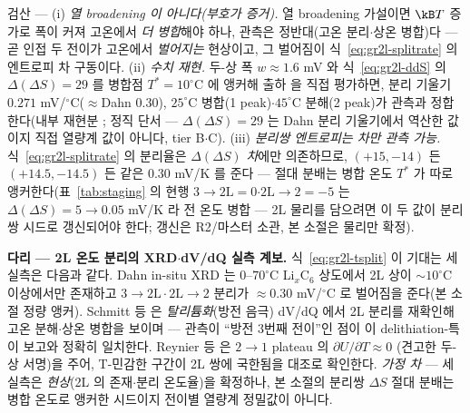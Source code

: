 \begin{verifybox}
검산 --- (i) \emph{열 broadening 이 아니다(부호가 증거).} 열 broadening 가설이면 $\kB T$ 증가로 폭이 커져 고온에서
\emph{더 병합}해야 하나, 관측은 정반대(고온 분리$\cdot$상온 병합)다 --- 곧 인접 두 전이가 고온에서 \emph{벌어지는}
현상이고, 그 벌어짐이 식~\eqref{eq:gr2l-splitrate} 의 엔트로피 차 구동이다. (ii) \emph{수치 재현.} 두-상 폭
$w\!\approx\!1.6$ mV 와 식~\eqref{eq:gr2l-ddS} 의 $\Delta(\Delta S){=}29$ 를 병합점 $T^\ast{=}10^\circ$C 에
앵커해 출하  을 직접 평가하면, 분리 기울기 $0.271$ mV/$^\circ$C($\approx$Dahn $0.30$),
$25^\circ$C 병합(1 peak)$\cdot$$45^\circ$C 분해(2 peak)가 관측과 정합한다(내부 재현분 ;
정직 단서 --- $\Delta(\Delta S){=}29$ 는 Dahn 분리 기울기에서 역산한 값이지 직접 열량계 값이 아니다,
tier B$\cdot$C). (iii) \emph{분리쌍 엔트로피는 차만 관측 가능.} 식~\eqref{eq:gr2l-splitrate} 의 분리율은
$\Delta(\Delta S)$ \emph{차}에만 의존하므로, $(+15,-14)$ 든 $(+14.5,-14.5)$ 든 같은 $0.30$ mV/K 를 준다 ---
절대 분배는 병합 온도 $T^\ast$ 가 따로 앵커한다(표~\ref{tab:staging} 의 현행 $3\!\to\!2\mathrm L{=}0$$\cdot$$2\mathrm
L\!\to\!2{=}{-}5$ 는 $\Delta(\Delta S){=}5\to0.05$ mV/K 라 전 온도 병합 --- 2L 물리를 담으려면 이 두 값이
분리쌍 시드로 갱신되어야 한다; 갱신은 R2/마스터 소관, 본 소절은 물리만 확정).
\end{verifybox}

\begin{srcbox}
\textbf{다리 --- 2L 온도 분리의 XRD$\cdot$dV/dQ 실측 계보.} 식~\eqref{eq:gr2l-tsplit} 이 기대는 세 실측은
다음과 같다. Dahn\cite{dahn1991} in-situ XRD 는 $0$--$70^\circ$C Li$_x$C$_6$ 상도에서 2L 상이 $\sim\!10^\circ$C
이상에서만 존재하고 $3\!\to\!2\mathrm L\cdot2\mathrm L\!\to\!2$ 분리가 $\approx0.30$ mV/$^\circ$C 로 벌어짐을
준다(본 소절 정량 앵커). Schmitt 등\cite{schmitt2022} 은 \emph{탈리튬화}(방전 음극) dV/dQ 에서 2L 분리를
재확인해 고온 분해$\cdot$상온 병합을 보이며 --- 관측이 ``방전 3번째 전이''인 점이 이 delithiation-특이 보고와
정확히 일치한다. Reynier 등\cite{reynier2003} 은 $2\!\to\!1$ plateau 의 $\partial U/\partial T\approx0$
(견고한 두-상 서명)을 주어, T-민감한 구간이 2L 쌍에 국한됨을 대조로 확인한다. \emph{가정 차} --- 세 실측은
\emph{현상}(2L 의 존재$\cdot$분리 온도율)을 확정하나, 본 소절의 분리쌍 $\Delta S$ 절대 분배는 병합 온도로
앵커한 시드이지 전이별 열량계 정밀값이 아니다.
\end{srcbox}

